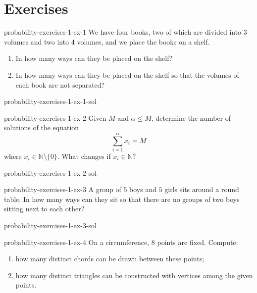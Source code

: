 \documentclass[preview]{standalone}
\begin{document}
\genpage

\section{Exercises}

\begin{snippetexercise}{probability-exercises-1-ex-1}{}
    We have four books, two of which are divided into \(3\) volumes and two into
    \(4\) volumes, and we place the books on a shelf.
    \begin{enumerate}
        \item In how many ways can they be placed on the shelf?
        \item In how many ways can they be placed on the shelf so that the volumes
        of each book are not separated?
    \end{enumerate}
\end{snippetexercise}

\begin{snippetsolution}{probability-exercises-1-ex-1-sol}{}
    \todo
\end{snippetsolution}

\begin{snippetexercise}{probability-exercises-1-ex-2}{}
    Given \(M\) and \(\alpha \leq M\), determine the number of solutions of the equation
    \[
        \sum_{i=1}^{\alpha} x_i = M
    \]
    where \(x_i \in \mathbb{N} \setminus \{0\}\). What changes if
    \(x_i \in \mathbb{N}\)?
\end{snippetexercise}

\begin{snippetsolution}{probability-exercises-1-ex-2-sol}{}
    \todo
\end{snippetsolution}

\begin{snippetexercise}{probability-exercises-1-ex-3}{}
    A group of \(5\) boys and \(5\) girls sits around a round table. In how many
    ways can they sit so that there are no groups of two boys sitting next to
    each other?
\end{snippetexercise}

\begin{snippetsolution}{probability-exercises-1-ex-3-sol}{}
    \todo
\end{snippetsolution}

\begin{snippetexercise}{probability-exercises-1-ex-4}{}
    On a circumference, \(8\) points are fixed. Compute:
    \begin{enumerate}
        \item how many distinct chords can be drawn between these points;
        \item how many distinct triangles can be constructed with vertices among
        the given points.
    \end{enumerate}
\end{snippetexercise}
\end{document}
